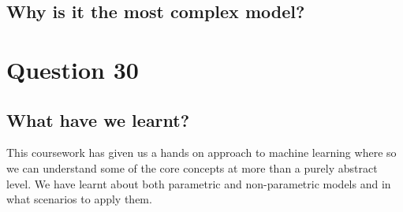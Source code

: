 \documentclass[a4paper, 9pt]{article}
\begin{document}
\subsection*{Why is it the most complex model?}

\section*{Question 30}
\subsection*{What have we learnt?}
This coursework has given us a hands on approach to machine learning where so we can understand some of the core concepts at more than a purely abstract level. We have learnt about both parametric and non-parametric models and in what scenarios to apply them. 
\end{document}
